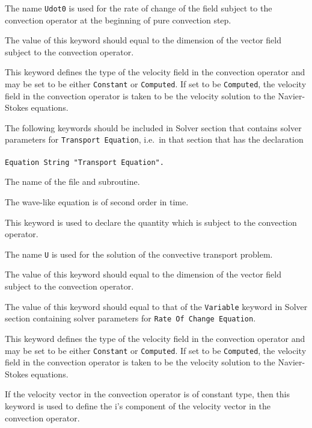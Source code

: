 The name {\tt Udot0} is used for the rate of change of the field 
subject to the convection operator at the beginning of pure convection step.  

The value of this keyword should equal to the dimension of the vector field 
subject to the convection operator.
 
This keyword defines the type of the velocity field in the convection operator
and may be set to be either {\tt Constant} or {\tt Computed}. 
If set to be {\tt Computed}, the velocity field in the convection 
operator is taken to be the velocity solution to the Navier-Stokes equations.
\sifend


The following keywords should be included in Solver section that contains
solver parameters for {\tt Transport Equation}, i.e.\ in that  
section that has the declaration \\ \\
{\tt Equation String "Transport Equation".}

\sifbegin
{} 
The name of the file and subroutine.

The wave-like equation is of second order in time.

This keyword is used to declare the quantity which is subject to the 
convection operator. 

The name {\tt U} is used for the solution of the convective transport problem.
  
The value of this keyword should equal to the dimension of the vector field 
subject to the convection operator.

The value of this keyword should equal to that of the {\tt Variable} 
keyword in Solver section containing solver parameters for 
{\tt Rate Of Change Equation}.

This keyword defines the type of the velocity field in the convection operator
and may be set to be either {\tt Constant} or {\tt Computed}. If set 
to be {\tt Computed}, the velocity field in the convection operator is 
taken to be the velocity solution to the Navier-Stokes equations.
\sifend


\sifbegin
{} 
If the velocity vector in the convection operator is of constant type, then 
this keyword is used to define the i's component of the velocity vector in the 
convection operator. 
\sifend


